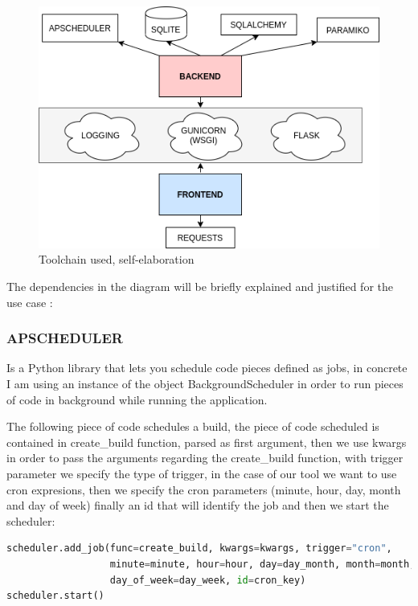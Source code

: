 \documentclass{article}
\begin{document}
\begin{figure}[H]
    \centering
    \includegraphics[scale=0.6]{tfg_toolchain}
    \caption{Toolchain used, self-elaboration}
\end{figure}

The dependencies in the diagram will be briefly explained and justified for the use case :

\subsubsection{APSCHEDULER}

Is a Python library that lets you schedule code pieces defined as jobs, in concrete I am using an instance of the object BackgroundScheduler in order to run pieces of code in background while running the application.

The following piece of code schedules a build, the piece of code scheduled is contained in create\_build function, parsed as first argument, then we use kwargs in order to pass the arguments regarding the create\_build function, with trigger parameter we specify the type of trigger, in the case of our tool we want to use cron expresions, then we specify the cron parameters (minute, hour, day, month and day of week) finally an id that will identify the job and then we start the scheduler:

\begin{lstlisting}[language=Python]
scheduler.add_job(func=create_build, kwargs=kwargs, trigger="cron", 
                  minute=minute, hour=hour, day=day_month, month=month, 
                  day_of_week=day_week, id=cron_key)
scheduler.start()
\end{lstlisting}
\end{document}
